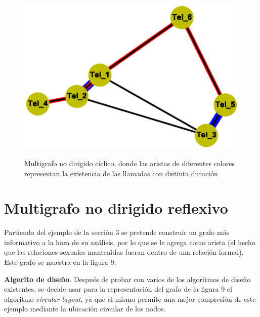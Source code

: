 \documentclass{article}
\begin{document}
\begin{center}

\end{center}
\begin{figure}[h]
\begin{center}
\includegraphics[scale=0.7]{Graf8_spectral_layout.eps}\\
\caption{Multigrafo no dirigido cíclico, donde las aristas de diferentes colores representan la existencia de las llamadas con distinta duración}
\end{center}
\end{figure}
\section{Multigrafo no dirigido reflexivo}
Partiendo del ejemplo de la sección 3 se pretende construir un grafo más informativo a la hora de su análisis, por lo que se le agrega como arista (el hecho que las relaciones sexuales mantenidas fueran dentro de una relación formal). Este grafo se muestra en la figura 9.\linebreak

\textbf{Algorito de diseño}.\linebreak
Después de probar con varios de los algoritmos de diseño existentes, se decide usar para la representación del grafo de la figura 9 el algoritmo \textit{circular layout}, ya que el mismo permite una mejor compresión de este ejemplo mediante la ubicación circular de los nodos.
\end{document}
